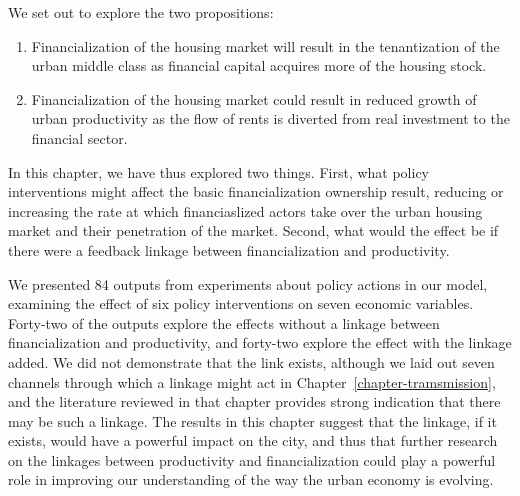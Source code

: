 We set out to explore the two propositions:
\begin{enumerate} 
\item Financialization of the housing market will result in the tenantization of the urban middle class as financial capital acquires more of the housing stock. %
\item Financialization of the housing market could result in reduced growth of urban productivity as the flow of rents is diverted from real investment to the financial sector.
\end{enumerate} 
In this chapter, we have thus explored two things. First, what policy interventions might affect the basic financialization ownership result, reducing or increasing the rate at which financiaslized actors take over the urban housing market and their penetration of the market. Second, what would the effect be if there were a feedback linkage between financialization and productivity. 


We presented 84 outputs from experiments about policy actions in our model, examining the effect of six policy interventions on seven economic variables. Forty-two of the outputs explore the effects without a linkage between financialization and productivity, and forty-two explore the effect with the linkage added. %
We did not demonstrate that the link exists, although we laid out seven channels through which a linkage might act in Chapter~\ref{chapter-tramsmission}, and the literature reviewed in that chapter provides strong indication that there may be such a linkage. %
The results in this chapter suggest that the linkage, if it exists, would have a powerful impact on the city, and thus that further research on the linkages between productivity and financialization could play a powerful role in improving our understanding of the way the urban economy is evolving. %

